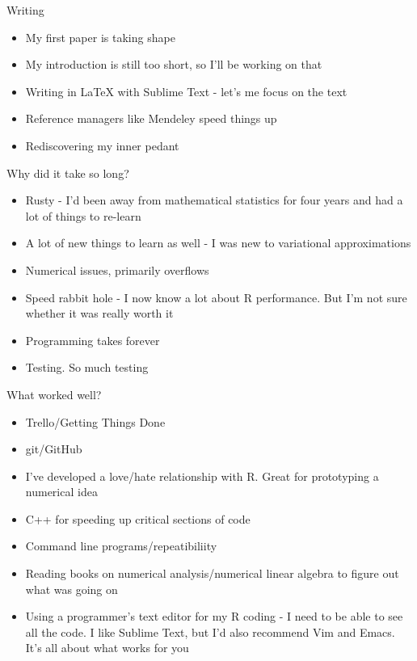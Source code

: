 \documentclass{beamer}
\begin{document}
\begin{frame}{Writing}
	\begin{itemize}
		\item My first paper is taking shape
		\item My introduction is still too short, so I'll be working on that
		\item Writing in LaTeX with Sublime Text - let's me focus on the text
		\item Reference managers like Mendeley speed things up
		\item Rediscovering my inner pedant
	\end{itemize}
\end{frame}

\begin{frame}{Why did it take so long?}
	\begin{itemize}
		\item Rusty - I'd been away from mathematical statistics for four years and had a lot of things to
					re-learn
		\item A lot of new things to learn as well - I was new to variational approximations
		\item Numerical issues, primarily overflows
		\item Speed rabbit hole - I now know a lot about R performance. But I'm not sure whether it was really
					worth it
		\item Programming takes forever
		\item Testing. So much testing
	\end{itemize}
\end{frame}

\begin{frame}{What worked well?}
	\begin{itemize}
		\item Trello/Getting Things Done
		\item git/GitHub
		\item I've developed a love/hate relationship with R. Great for prototyping a numerical idea
		\item C++ for speeding up critical sections of code
		\item Command line programs/repeatibiliity
		\item Reading books on numerical analysis/numerical linear algebra to figure out what was going on
		\item Using a programmer's text editor for my R coding - I need to be able to see all the code. I like
					Sublime Text, but I'd also recommend Vim and Emacs. It's all about what works for you
	\end{itemize}
\end{frame}
\end{document}

